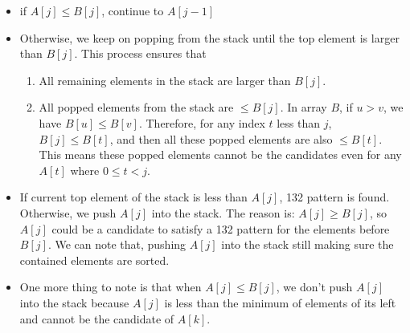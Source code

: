 \begin{itemize}
\item if $A[j] \leq B[j]$, continue to $A[j-1]$
\item Otherwise, we keep on popping from the stack until the top element is larger than $B[j]$. This process ensures that 
\begin{enumerate}
\item All remaining elements in the stack are larger than $B[j]$.
\item All popped elements from the stack are $\leq B[j]$. In array $B$, if $u > v$, we have $B[u]\leq B[v]$. Therefore, for any index $t$ less than $j$, $B[j]\leq B[t]$, and then all these popped elements are also $\leq B[t]$. This means these popped elements cannot be the candidates even for any $A[t]$ where $0\leq t <j$. 
\end{enumerate}
\item  If current top element of the stack is less than $A[j]$, 132 pattern is found. Otherwise, we push $A[j]$ into the stack. The reason is: $A[j] \geq B[j]$, so $A[j]$ could be a candidate to satisfy a 132 pattern for the elements before $B[j]$. We can note that, pushing $A[j]$ into the stack still making sure the contained elements are sorted.
\item One more thing to note is that when $A[j]\leq B[j]$, we don't push $A[j]$ into the stack because $A[j]$ is less than the minimum of elements of its left and cannot be the candidate of $A[k]$.
\end{itemize}

